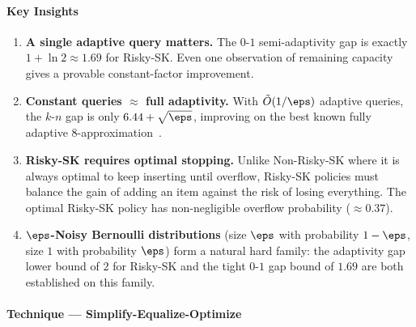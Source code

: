 \begin{center}
\end{center}

\paragraph{Key Insights}

\begin{enumerate}
    \item \textbf{A single adaptive query matters.} The $0$-$1$ semi-adaptivity gap is exactly $1 + \ln 2 \approx 1.69$ for Risky-SK. Even one observation of remaining capacity gives a provable constant-factor improvement.

    \item \textbf{Constant queries $\approx$ full adaptivity.} With $\tilde{O}(1/\eps)$ adaptive queries, the $k$-$n$ gap is only $6.44 + \sqrt{\eps}$, improving on the best known fully adaptive $8$-approximation~\cite{FLX18}.

    \item \textbf{Risky-SK requires optimal stopping.} Unlike Non-Risky-SK where it is always optimal to keep inserting until overflow, Risky-SK policies must balance the gain of adding an item against the risk of losing everything. The optimal Risky-SK policy has non-negligible overflow probability ($\approx 0.37$).

    \item \textbf{$\eps$-Noisy Bernoulli distributions} (size $\eps$ with probability $1-\eps$, size $1$ with probability $\eps$) form a natural hard family: the adaptivity gap lower bound of $2$ for Risky-SK and the tight $0$-$1$ gap bound of $1.69$ are both established on this family.
\end{enumerate}

\paragraph{Technique --- Simplify-Equalize-Optimize}

